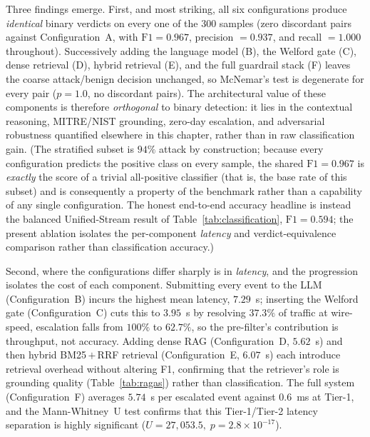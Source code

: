 Three findings emerge. First, and most striking, all six configurations produce \emph{identical} binary verdicts on every one of the 300 samples (zero discordant pairs against Configuration~A, with $\mathrm{F1}=0.967$, precision $=0.937$, and recall $=1.000$ throughout). Successively adding the language model (B), the Welford gate (C), dense retrieval (D), hybrid retrieval (E), and the full guardrail stack (F) leaves the coarse attack/benign decision unchanged, so McNemar's test is degenerate for every pair ($p = 1.0$, no discordant pairs). The architectural value of these components is therefore \emph{orthogonal} to binary detection: it lies in the contextual reasoning, MITRE/NIST grounding, zero-day escalation, and adversarial robustness quantified elsewhere in this chapter, rather than in raw classification gain. (The stratified subset is $94\%$ attack by construction; because every configuration predicts the positive class on every sample, the shared $\mathrm{F1}=0.967$ is \emph{exactly} the score of a trivial all-positive classifier (that is, the base rate of this subset) and is consequently a property of the benchmark rather than a capability of any single configuration. The honest end-to-end accuracy headline is instead the balanced Unified-Stream result of Table~\ref{tab:classification}, $\mathrm{F1}=0.594$; the present ablation isolates the per-component \emph{latency} and verdict-equivalence comparison rather than classification accuracy.)

Second, where the configurations differ sharply is in \emph{latency}, and the progression isolates the cost of each component. Submitting every event to the LLM (Configuration~B) incurs the highest mean latency, $7.29$~s; inserting the Welford gate (Configuration~C) cuts this to $3.95$~s by resolving $37.3\%$ of traffic at wire-speed, escalation falls from $100\%$ to $62.7\%$, so the pre-filter's contribution is throughput, not accuracy. Adding dense RAG (Configuration~D, $5.62$~s) and then hybrid BM25\,$+$\,RRF retrieval (Configuration~E, $6.07$~s) each introduce retrieval overhead without altering F1, confirming that the retriever's role is grounding quality (Table~\ref{tab:ragas}) rather than classification. The full system (Configuration~F) averages $5.74$~s per escalated event against $0.6$~ms at Tier-1, and the Mann-Whitney~U test confirms that this Tier-1/Tier-2 latency separation is highly significant ($U=27{,}053.5,\; p = 2.8\times10^{-17}$).

